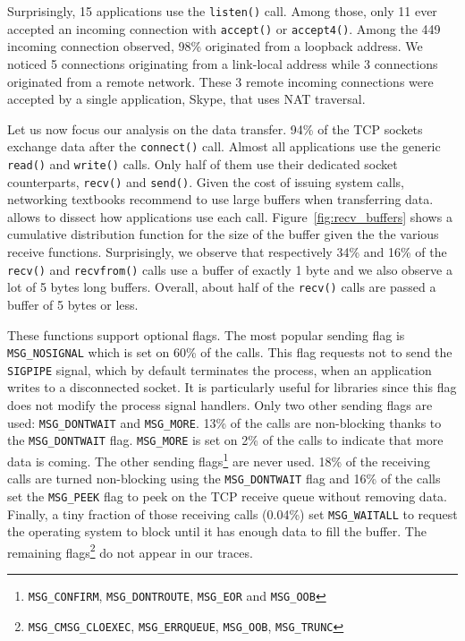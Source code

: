 Surprisingly, 15 applications use the
\texttt{listen()} call. Among those, only 11 ever accepted an incoming
connection with \texttt{accept()} or \texttt{accept4()}. Among the 449 incoming
connection observed, 98\% originated from a loopback address.
We noticed 5 connections originating from a link-local address while
3 connections originated from a remote network. These 3 remote incoming
connections were accepted by a single application, Skype, that uses NAT
traversal.

Let us now focus our analysis on the data transfer. 94\% of the TCP sockets
exchange data after the \texttt{connect()} call. Almost all
applications use the generic \texttt{read()} and \texttt{write()} calls.
Only half of them use their dedicated socket counterparts, \texttt{recv()} and
\texttt{send()}. Given the cost of issuing system calls, networking
textbooks recommend to use large buffers when transferring data.
\tcpsnitch allows to dissect how applications use each call.
Figure~\ref{fig:recv_buffers} shows a cumulative distribution function for the
size of the buffer given the the various receive functions. Surprisingly,
we observe that respectively 34\% and 16\% of the \texttt{recv()} and
\texttt{recvfrom()} calls use a buffer of exactly 1 byte and we also observe a
lot of 5 bytes long buffers. Overall, about half of the \texttt{recv()} calls
are passed a buffer of 5 bytes or less.

These functions support optional flags. The most popular sending flag is
\texttt{MSG\_NOSIGNAL} which is set on 60\% of the calls. This flag requests
not to send the \texttt{SIGPIPE} signal, which by default terminates the
process, when an application writes to a disconnected socket. It
is particularly useful for libraries since this flag does not modify
the process signal handlers. Only two other sending flags are used:
\texttt{MSG\_DONTWAIT} and \texttt{MSG\_MORE}. 13\% of the calls
are non-blocking thanks to the \texttt{MSG\_DONTWAIT} flag. 
\texttt{MSG\_MORE} is set on 2\% of the calls to indicate that more data is
coming. The other sending flags\footnote{\texttt{MSG\_CONFIRM},
\texttt{MSG\_DONTROUTE}, \texttt{MSG\_EOR} and \texttt{MSG\_OOB}} are never used.
18\% of the receiving calls are turned non-blocking using
the \texttt{MSG\_DONTWAIT} flag and 16\% of the calls set the
\texttt{MSG\_PEEK} flag to peek on the TCP receive queue without removing data.
Finally, a tiny fraction of those receiving calls (0.04\%) set
\texttt{MSG\_WAITALL} to request the operating system to block until it has
enough data to fill the buffer. The remaining flags\footnote{\texttt{MSG\_CMSG\_CLOEXEC},
\texttt{MSG\_ERRQUEUE}, \texttt{MSG\_OOB}, \texttt{MSG\_TRUNC}} do not
appear in our traces.

